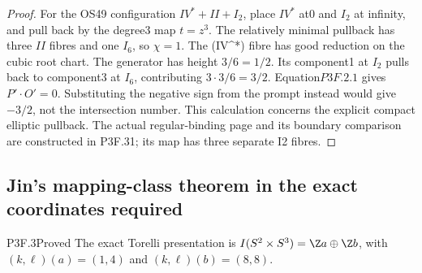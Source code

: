 \begin{proof}
For the OS49 configuration \(IV^*+II+I_2\), place \(IV^*\) at0 and \(I_2\) at infinity, and pull back by the degree3 map \(t=z^3\). The relatively minimal pullback has three \(II\) fibres and one \(I_6\), so \(\chi=1\). The (IV\^{}*) fibre has good reduction on the cubic root chart. The generator has height \(3/6=1/2\). Its component1 at \(I_2\) pulls back to component3 at \(I_6\), contributing \(3\cdot3/6=3/2\). Equation\(P3F.2.1\) gives \(P'\cdot O'=0\). Substituting the negative sign from the prompt instead would give \(-3/2\), not the intersection number. This calculation concerns the explicit compact elliptic pullback. The actual regular-binding page and its boundary comparison are constructed in P3F.31; its map has three separate I2 fibres.
\end{proof}
\subsection{Jin's mapping-class theorem in the exact coordinates required}
\begin{statement}{P3F.3}{Proved}
The exact Torelli presentation is $I(S^2\times S^3)=\Z a\oplus\Z b$, with $(k,\ell)(a)=(1,4)$ and $(k,\ell)(b)=(8,8)$.
\end{statement}
